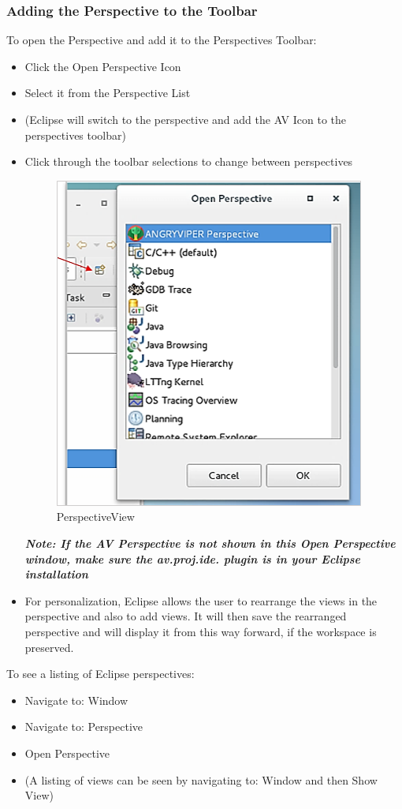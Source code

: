 \documentclass[10pt, a4paper, oneside]{article}
\begin{document}
\subsubsection{Adding the Perspective to the Toolbar}
To open the Perspective and add it to the Perspectives Toolbar:
\begin{itemize}
\item Click the Open Perspective Icon
\item Select it from the Perspective List
\item[](Eclipse will switch to the perspective and add the AV Icon to the perspectives toolbar)
\item Click through the toolbar selections to change between perspectives\\
\begin{figure}[h!]
  \centering
  \caption{PerspectiveView}\label{fig:Perspective View}
    \includegraphics[width=.65\textwidth]{AVPerspectiveView.png}
\end{figure}


\textbf{\emph{Note: If the AV Perspective is not shown in this Open Perspective window, make sure the \textbf{av.proj.ide. plugin} is in your Eclipse installation}}
\item[]For personalization, Eclipse allows the user to rearrange the views in the perspective and also to add views. It will then save the rearranged perspective and will display it from this way forward, if the workspace is preserved.
\end{itemize}
To see a listing of Eclipse perspectives:
\begin{itemize}
\item Navigate to: Window
\item Navigate to: Perspective
\item Open Perspective
\item[] (A listing of views can be seen by navigating to: Window and then Show View)
\end{itemize}
\end{document}
